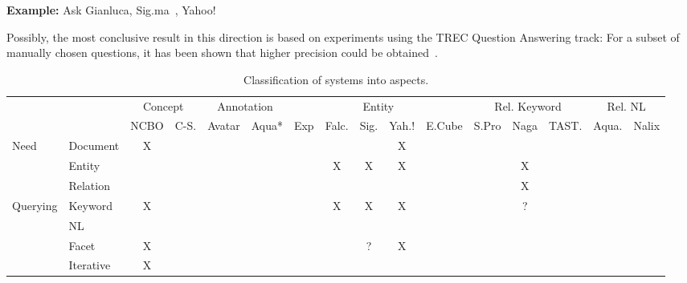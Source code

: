 \textbf{Example:}
Ask Gianluca, Sig.ma~\cite{DBLP:conf/sigir/Chu-CarrollPCFD06}, Yahoo! 


Possibly, the most conclusive result in this direction is based on experiments using the TREC Question Answering track: For a subset of manually chosen questions, it has been shown that higher precision could be obtained~\cite{DBLP:conf/sigir/Chu-CarrollPCFD06}. 

\begin{table}[htbp]
  \centering
  \caption{Classification of systems into aspects.}
    \begin{tabular}{rrcccccccccccccc}
    \multicolumn{1}{c}{} & \multicolumn{1}{c}{} & \multicolumn{2}{c}{Concept} & \multicolumn{2}{c}{Annotation} & \multicolumn{5}{c}{Entity}            & \multicolumn{3}{c}{Rel. Keyword} & \multicolumn{2}{c}{Rel. NL} & \\
    \multicolumn{1}{c}{} & \multicolumn{1}{c}{} & NCBO  & C-S.  & Avatar & Aqua* & Exp   & Falc. & Sig.  & Yah.! & E.Cube & S.Pro & Naga  & TAST. & Aqua. & Nalix \\
    \multicolumn{1}{l}{\multirow{3}[0]{*}{Need}} & \multicolumn{1}{l}{Document} & X     &       &       &       &       &       &       & X     &       &       &       &       &       &  \\
    \multicolumn{1}{l}{} & \multicolumn{1}{l}{Entity} &       &       &       &       &       & X     & X     & X     &       &       & X     &       &       &  \\
    \multicolumn{1}{l}{} & \multicolumn{1}{l}{Relation} &       &       &       &       &       &       &       &       &       &       & X     &       &       &  \\
    \multicolumn{1}{l}{\multirow{4}[0]{*}{Querying}} & \multicolumn{1}{l}{Keyword} & X     &       &       &       &       & X     & X     & X     &       &       & ?     &       &       &  \\
    \multicolumn{1}{l}{} & \multicolumn{1}{l}{NL} &       &       &       &       &       &       &       &       &       &       &       &       &       &  \\
    \multicolumn{1}{l}{} & \multicolumn{1}{l}{Facet} & X     &       &       &       &       &       & ?     & X     &       &       &       &       &       &  \\
    \multicolumn{1}{l}{} & \multicolumn{1}{l}{Iterative} & X     &       &       &       &       &       &       &       &       &       &       &       &       &  \\

\end{tabular}
\end{table}
